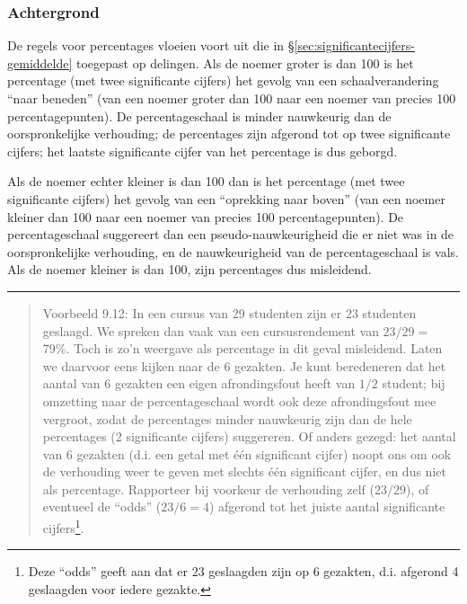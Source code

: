 \documentclass[
]{book}
\begin{document}
\hypertarget{achtergrond-1}{%
\subsubsection{Achtergrond}\label{achtergrond-1}}

De regels voor percentages vloeien voort uit die in
§\ref{sec:significantecijfers-gemiddelde} toegepast op delingen.
Als de noemer groter is dan 100 is het percentage (met twee significante
cijfers) het gevolg van een schaalverandering ``naar beneden'' (van een
noemer groter dan 100 naar een noemer van precies 100 percentagepunten).
De percentageschaal is minder nauwkeurig dan de oorspronkelijke
verhouding; de percentages zijn afgerond tot op twee significante
cijfers; het laatste significante cijfer van het percentage is dus
geborgd.

Als de noemer echter kleiner is dan 100 dan is het percentage (met twee
significante cijfers) het gevolg van een ``oprekking naar boven'' (van een
noemer kleiner dan 100 naar een noemer van precies 100
percentagepunten). De percentageschaal suggereert dan een
pseudo-nauwkeurigheid die er niet was in de oorspronkelijke verhouding,
en de nauwkeurigheid van de percentageschaal is vals. Als de noemer
kleiner is dan 100, zijn percentages dus misleidend.

\begin{center}\rule{0.5\linewidth}{0.5pt}\end{center}

\begin{quote}
Voorbeeld 9.12:
In een cursus van 29 studenten zijn er 23 studenten geslaagd. We spreken
dan vaak van een cursusrendement van \(23/29=\) 79\%. Toch is zo'n weergave
als percentage in dit geval misleidend. Laten we daarvoor eens kijken
naar de 6 gezakten. Je kunt beredeneren dat het aantal van 6 gezakten
een eigen afrondingsfout heeft van \(1/2\) student; bij omzetting naar de
percentageschaal wordt ook deze afrondingsfout mee vergroot, zodat de
percentages minder nauwkeurig zijn dan de hele percentages (2
significante cijfers) suggereren. Of anders gezegd: het aantal van 6
gezakten (d.i. een getal met één significant cijfer) noopt ons om ook de
verhouding weer te geven met slechts één significant cijfer, en dus niet
als percentage. Rapporteer bij voorkeur de verhouding zelf (\(23/29\)), of
eventueel de ``odds'' (\(23/6=4\)) afgerond tot het juiste aantal
significante cijfers\footnote{Deze ``odds'' geeft aan dat er 23 geslaagden zijn op 6 gezakten, d.i. afgerond 4 geslaagden voor iedere gezakte.}.
\end{quote}
\end{document}
